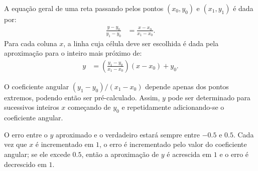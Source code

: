 A equação geral de uma reta passando pelos pontos $(x_0,y_0)$ e  $(x_1,y_1)$
é dada por:
\begin{align*}
\frac{y - y_0}{y_1 - y_0} &= \frac{x - x_0}{x_1 - x_0}.
\end{align*}
Para cada coluna $x$, a linha cuja célula deve ser escolhida é dada pela
aproximação para o inteiro mais próximo de:
\begin{align*}
y &= \left( \frac{y_1 - y_0}{x_1 - x_0} \right) \left( x - x_0 \right) + y_0.
\end{align*}

O coeficiente angular $(y_1-y_0)/(x_1-x_0)$ depende apenas dos pontos
extremos, podendo então ser pré-calculado. Assim, $y$ pode ser determinado para
sucessivos inteiros $x$ começando de $y_0$ e repetidamente adicionando-se o
coeficiente angular.

O erro entre o $y$ aproximado e o verdadeiro estará sempre entre $-0.5$ e
$0.5$. Cada vez que $x$ é incrementado em $1$, o erro é incrementado pelo valor
do coeficiente angular; se ele excede $0.5$, então a aproximação de $y$ é
acrescida em $1$ e o erro é decrescido em $1$.

\nocite{wiki:Bresenham_line}
